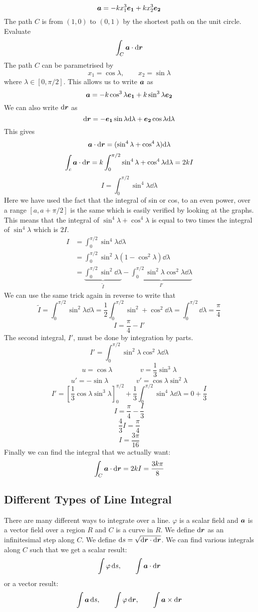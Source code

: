\documentclass{article}
\begin{document}
    \example
    \[\bm{a} = -kx_1^3\bm{e_{1}} + kx_2^3\bm{e_{2}}\]
    The path \(C\) is from \((1, 0)\) to \((0, 1)\) by the shortest path on the unit circle.
    Evaluate
    \[\int_C\bm{a}\cdot\dd\bm{r}\]
    The path \(C\) can be parametrised by
    \[x_1 = \cos\lambda,\qquad x_2 = \sin\lambda\]
    where \(\lambda\in[0,\pi/2]\).
    This allows us to write \(\bm{a}\) as
    \[\bm{a} = -k\cos^3\lambda\bm{e_{1}} + k\sin^3\lambda\bm{e_{2}}\]
    We can also write \(\dd\bm{r}\) as
    \[\dd\bm{r} = -\bm{e_{1}}\sin\lambda\dd\lambda + \bm{e_{2}}\cos\lambda\dd\lambda\]
    This gives
    \[\bm{a}\cdot\dd\bm{r} = (\sin^4\lambda + \cos^4\lambda)\dd\lambda\]
    \[\int_c\bm{a}\cdot\dd\bm{r} = k\int_0^{\pi/2}\sin^4\lambda + \cos^4\lambda\dd\lambda = 2kI\]
    \[I = \int_0^{\pi/2}\sin^4\lambda\dd\lambda\]
    Here we have used the fact that the integral of sin or cos, to an even power, over a range \([a, a+\pi/2]\) is the same which is easily verified by looking at the graphs.
    This means that the integral of \(\sin^4\lambda + \cos^4\lambda\) is equal to two times the integral of \(\sin^4\lambda\) which is \(2I\).
    \begin{align*}
        I &= \int_0^{\pi/2}\sin^4\lambda\dd\lambda\\
        &= \int_0^{\pi/2}\sin^2\lambda(1 - \cos^2\lambda)\dd\lambda\\
        &= \underbrace{\int_0^{\pi/2}\sin^2\dd\lambda}_{\tilde I} - \underbrace{\int_0^{\pi/2}\sin^2\lambda\cos^2\lambda\dd\lambda}_{I'}
    \end{align*}
    We can use the same trick again in reverse to write that
    \[\tilde{I} = \int_0^{\pi/2}\sin^2\lambda\dd\lambda = \frac{1}{2}\int_0^{\pi/2}\sin^2 + \cos^2\dd\lambda = \int_0^{\pi/2}\dd\lambda = \frac{\pi}{4}\]
    \[I = \frac{\pi}{4} - I'\]
    The second integral, \(I'\), must be done by integration by parts.
    \[I' = \int_0^{\pi/2}\sin^2\lambda\cos^2\lambda\dd\lambda\]
    \[u = \cos \lambda \qquad\qquad v = \frac{1}{3}\sin^3\lambda\]
    \[u' = -\sin \lambda\qquad\qquad v' = \cos \lambda\sin^2 \lambda\]
    \[I' = \left[\frac{1}{3}\cos \lambda\sin^3 \lambda\right]_0^{\pi/2} + \frac{1}{3}\int_0^{\pi/2}\sin^4 \lambda\dd\lambda = 0 + \frac{I}{3}\]
    \[I = \frac{\pi}{4} - \frac{I}{3}\]
    \[\frac{4}{3}I = \frac{\pi}{4}\]
    \[I = \frac{3\pi}{16}\]
    Finally we can find the integral that we actually want:
    \[\int_C\bm{a}\cdot\dd\bm{r} = 2kI = \frac{3k\pi}{8}\]
    
    \subsection{Different Types of Line Integral}
    There are many different ways to integrate over a line.
    \(\varphi\) is a scalar field and \(\bm{a}\) is a vector field over a region \(R\) and \(C\) is a curve in \(R\).
    We define \(\dd\bm{r}\) as an infinitesimal step along \(C\).
    We define \(\dd s = \sqrt{\dd\bm{r}\cdot\dd\bm{r}}\).
    We can find various integrals along \(C\) such that we get a scalar result:
    \[\int\varphi\,\dd s, \qquad \int\bm{a}\cdot\dd\bm{r}\]
    or a vector result:
    \[\int\bm{a}\,\dd s, \qquad \int\varphi\,\dd\bm{r}, \qquad \int\bm{a}\times\dd\bm{r}\]
    
\end{document}
